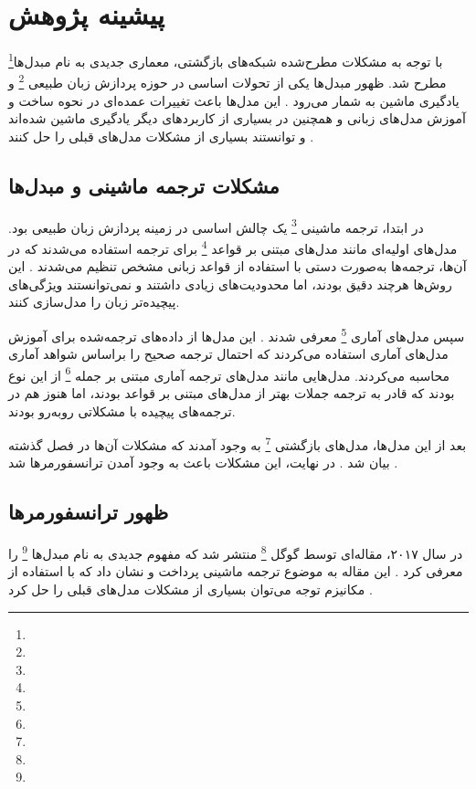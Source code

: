 \chapter{پیشینه پژوهش}


با توجه به مشکلات مطرح‌شده شبکه‌های بازگشتی، معماری جدیدی به نام مبدل‌ها\footnote{} مطرح شد.
ظهور مبدل‌ها یکی از تحولات اساسی در حوزه پردازش زبان طبیعی \footnote{} و یادگیری ماشین به شمار می‌رود \cite{vaswani2017attention,bahdanau2014neural}.
این مدل‌ها باعث تغییرات عمده‌ای در نحوه ساخت و آموزش مدل‌های زبانی و همچنین در بسیاری از کاربردهای دیگر یادگیری ماشین شده‌اند و توانستند بسیاری از مشکلات مدل‌های قبلی را حل کنند \cite{devlin2018bert,radford2018improving}.

\section{مشکلات ترجمه ماشینی و مبدل‌ها}

در ابتدا، ترجمه ماشینی \footnote{} یک چالش اساسی در زمینه پردازش زبان طبیعی بود. مدل‌های اولیه‌ای مانند مدل‌های مبتنی بر قواعد \footnote{} برای ترجمه استفاده می‌شدند که در آن‌ها، ترجمه‌ها به‌صورت دستی با استفاده از قواعد زبانی مشخص تنظیم می‌شدند \cite{nagao1984framework,hutchins1986machine}. این روش‌ها هرچند دقیق بودند، اما محدودیت‌های زیادی داشتند و نمی‌توانستند ویژگی‌های پیچیده‌تر زبان را مدل‌سازی کنند.

سپس مدل‌های آماری \footnote{} معرفی شدند \cite{brown1993mathematics,koehn2010statistical}. این مدل‌ها از داده‌های ترجمه‌شده برای آموزش مدل‌های آماری استفاده می‌کردند که احتمال ترجمه صحیح را براساس شواهد آماری محاسبه می‌کردند. مدل‌هایی مانند مدل‌های ترجمه آماری مبتنی بر جمله \footnote{} \cite{koehn2003statistical} از این نوع بودند که قادر به ترجمه جملات بهتر از مدل‌های مبتنی بر قواعد بودند، اما هنوز هم در ترجمه‌های پیچیده با مشکلاتی روبه‌رو بودند.

بعد از این مدل‌ها، مدل‌های بازگشتی \footnote{} به وجود آمدند که مشکلات آن‌ها در فصل گذشته بیان شد \cite{elman1990finding,sutskever2014sequence}. در نهایت، این مشکلات باعث به وجود آمدن ترانسفورمرها شد \cite{bahdanau2014neural}.

\section{ظهور ترانسفورمرها}
در سال ۲۰۱۷، مقاله‌ای توسط گوگل \footnote{} منتشر شد که مفهوم جدیدی به نام مبدل‌ها \footnote{} را معرفی کرد \cite{vaswani2017attention}. این مقاله به موضوع ترجمه ماشینی پرداخت و نشان داد که با استفاده از مکانیزم توجه می‌توان بسیاری از مشکلات مدل‌های قبلی را حل کرد \cite{luong2015effective}.

